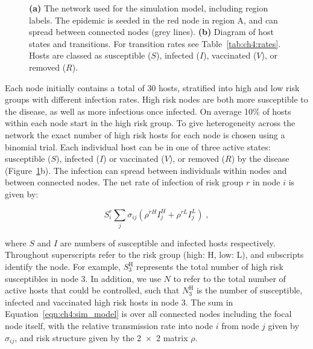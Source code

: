 \begin{figure}[htb]
    \centering
    \hspace{0em}
    \caption{\textbf{(a)} The network used for the simulation model, including region labels. The epidemic is seeded in the red node in region A, and can spread between connected nodes (grey lines). \textbf{(b)} Diagram of host states and transitions. For transition rates see Table~\ref{tab:ch4:rates}. Hosts are classed as susceptible ($S$), infected ($I$), vaccinated ($V$), or removed ($R$). }
    \label{fig:ch4:node_structure_and_model}
\end{figure}

Each node initially contains a total of 30 hosts, stratified into high and low risk groups with different infection rates. High risk nodes are both more susceptible to the disease, as well as more infectious once infected. On average 10\% of hosts within each node start in the high risk group. To give heterogeneity across the network the exact number of high risk hosts for each node is chosen using a binomial trial. Each individual host can be in one of three active states: susceptible ($S$), infected ($I$) or vaccinated ($V$), or removed ($R$) by the disease (Figure~\ref{fig:ch4:node_structure_and_model}b). The infection can spread between individuals within nodes and between connected nodes. The net rate of infection of risk group $r$ in node $i$ is given by:
\begin{linenomath*}
    \begin{equation}
        S_i^r \sum_j \sigma_{ij} \left(\rho^{rH}I_j^H + \rho^{rL}I_j^L\right)\;,
    \label{eqn:ch4:sim_model}
    \end{equation}
\end{linenomath*}
where $S$ and $I$ are numbers of susceptible and infected hosts respectively. Throughout superscripts refer to the risk group (high: H, low: L), and subscripts identify the node. For example, $S_{3}^\mathrm{H}$ represents the total number of high risk susceptibles in node 3. In addition, we use $N$ to refer to the total number of active hosts that could be controlled, such that $N_{3}^\mathrm{H}$ is the number of susceptible, infected and vaccinated high risk hosts in node 3. The sum in Equation~\ref{eqn:ch4:sim_model} is over all connected nodes including the focal node itself, with the relative transmission rate into node $i$ from node $j$ given by $\sigma_{ij}$, and risk structure given by the \num{2x2} matrix $\rho$.

